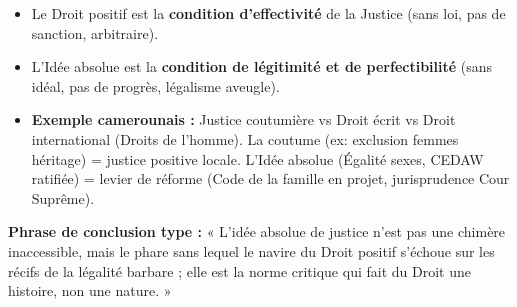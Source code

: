 \documentclass[11pt]{article}
\begin{document}
\begin{exoresolu}
\begin{enumerate}
\begin{itemize}
        \item Le Droit positif est la \textbf{condition d'effectivité} de la Justice (sans loi, pas de sanction, arbitraire).
        \item L'Idée absolue est la \textbf{condition de légitimité et de perfectibilité} (sans idéal, pas de progrès, légalisme aveugle).
        \item \textbf{Exemple camerounais :} Justice coutumière vs Droit écrit vs Droit international (Droits de l'homme). La coutume (ex: exclusion femmes héritage) = justice positive locale. L'Idée absolue (Égalité sexes, CEDAW ratifiée) = levier de réforme (Code de la famille en projet, jurisprudence Cour Suprême).
    \end{itemize}
\end{enumerate}
\textbf{Phrase de conclusion type :} « L'idée absolue de justice n'est pas une chimère inaccessible, mais le phare sans lequel le navire du Droit positif s'échoue sur les récifs de la légalité barbare ; elle est la norme critique qui fait du Droit une histoire, non une nature. »
\end{exoresolu}
\end{document}
